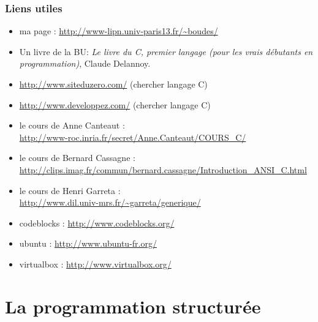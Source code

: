 \documentclass[xcolor=svgnames]{beamer}
\begin{document}
\begin{frame}
  \frametitle{Liens utiles\nowrite}

  \begin{itemize} 
\item ma page : \url{http://www-lipn.univ-paris13.fr/~boudes/}
\item Un livre de la BU: \emph{Le livre du C, premier langage (pour les
  vrais débutants en programmation)}, Claude Delannoy.
\item \url{http://www.siteduzero.com/} (chercher langage C)
\item \url{http://www.developpez.com/} (chercher langage C)
\item le cours de Anne Canteaut :\\ {\small\url{http://www-roc.inria.fr/secret/Anne.Canteaut/COURS_C/}}
\item le cours de Bernard Cassagne :\\ {\small\url{http://clips.imag.fr/commun/bernard.cassagne/Introduction_ANSI_C.html}}
\item le cours de Henri Garreta  : \\
{\small\url{http://www.dil.univ-mrs.fr/~garreta/generique/}}
\item codeblocks : \url{http://www.codeblocks.org/}
\item ubuntu : \url{http://www.ubuntu-fr.org/}
\item virtualbox : \url{http://www.virtualbox.org/}
  \end{itemize} 
\end{frame}



\section[Plan]{}
\frame[label=plan]{\tableofcontents%
}
\section{La programmation structurée}
\end{document}
